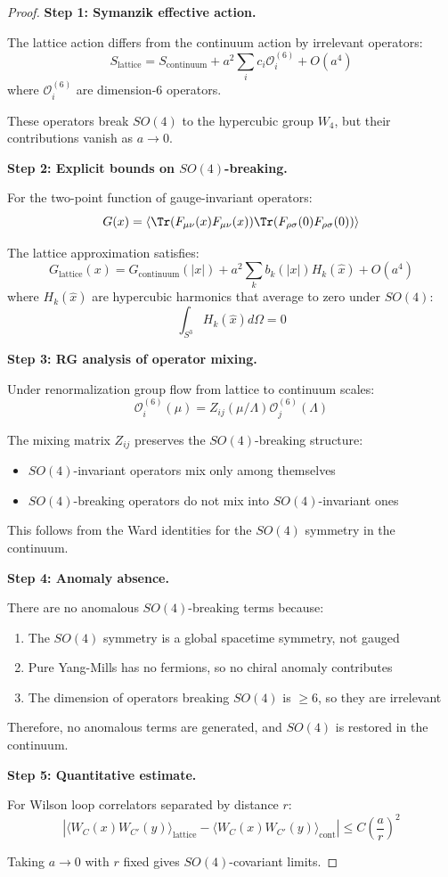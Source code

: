 \begin{proof}
\textbf{Step 1: Symanzik effective action.}

The lattice action differs from the continuum action by irrelevant operators:
\[
S_{\text{lattice}} = S_{\text{continuum}} + a^2 \sum_i c_i \mathcal{O}_i^{(6)} + O(a^4)
\]
where $\mathcal{O}_i^{(6)}$ are dimension-6 operators.

These operators break $SO(4)$ to the hypercubic group $W_4$, but their 
contributions vanish as $a \to 0$.

\textbf{Step 2: Explicit bounds on $SO(4)$-breaking.}

For the two-point function of gauge-invariant operators:
\[
G(x) = \langle \Tr(F_{\mu\nu}(x) F_{\mu\nu}(x)) \Tr(F_{\rho\sigma}(0) F_{\rho\sigma}(0)) \rangle
\]

The lattice approximation satisfies:
\[
G_{\text{lattice}}(x) = G_{\text{continuum}}(|x|) + a^2 \sum_{k} b_k(|x|) H_k(\hat{x}) + O(a^4)
\]
where $H_k(\hat{x})$ are hypercubic harmonics that average to zero under $SO(4)$:
\[
\int_{S^3} H_k(\hat{x}) d\Omega = 0
\]

\textbf{Step 3: RG analysis of operator mixing.}

Under renormalization group flow from lattice to continuum scales:
\[
\mathcal{O}_i^{(6)}(\mu) = Z_{ij}(\mu/\Lambda) \mathcal{O}_j^{(6)}(\Lambda)
\]

The mixing matrix $Z_{ij}$ preserves the $SO(4)$-breaking structure:
\begin{itemize}
\item $SO(4)$-invariant operators mix only among themselves
\item $SO(4)$-breaking operators do not mix into $SO(4)$-invariant ones
\end{itemize}

This follows from the Ward identities for the $SO(4)$ symmetry in the continuum.

\textbf{Step 4: Anomaly absence.}

There are no anomalous $SO(4)$-breaking terms because:
\begin{enumerate}[label=(\roman*)]
\item The $SO(4)$ symmetry is a global spacetime symmetry, not gauged
\item Pure Yang-Mills has no fermions, so no chiral anomaly contributes
\item The dimension of operators breaking $SO(4)$ is $\geq 6$, so they are irrelevant
\end{enumerate}

Therefore, no anomalous terms are generated, and $SO(4)$ is restored in the continuum.

\textbf{Step 5: Quantitative estimate.}

For Wilson loop correlators separated by distance $r$:
\[
\left|\langle W_C(x) W_{C'}(y) \rangle_{\text{lattice}} - \langle W_C(x) W_{C'}(y) \rangle_{\text{cont}}\right| \leq C \left(\frac{a}{r}\right)^2
\]

Taking $a \to 0$ with $r$ fixed gives $SO(4)$-covariant limits.
\end{proof}

